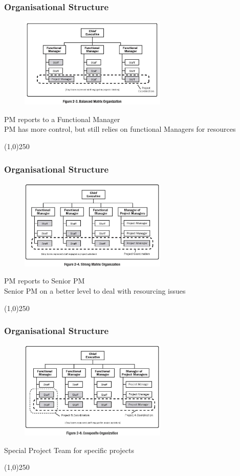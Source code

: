 \begin{frame}
\frametitle{Organisational Structure}
\begin{figure}
	\centering
		\includegraphics[width = 7cm]{images/Fig2-3.jpg}
	\label{fig:2-3}
\end{figure}PM reports to a Functional Manager\\
PM has more control, but still relies on functional Managers for resources\\
\end{frame}
\begin{center}\line(1,0){250}\end{center}



\begin{frame}
\frametitle{Organisational Structure}
\begin{figure}
	\centering
		\includegraphics[width = 7cm]{images/Fig2-4.jpg}
	\label{fig:2-4}
\end{figure}PM reports to Senior PM\\
Senior PM on a better level to deal with resourcing issues\\
\end{frame}
\begin{center}\line(1,0){250}\end{center}



\begin{frame}
\frametitle{Organisational Structure}
\begin{figure}
	\centering
		\includegraphics[width = 7cm]{images/Fig2-6.jpg}
	\label{fig:2-6}
\end{figure}Special Project Team for specific projects\\
\end{frame}
\begin{center}\line(1,0){250}\end{center}


